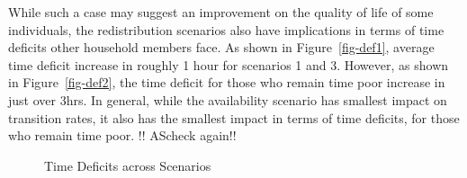 \documentclass[
  11pt,
]{article}
\begin{document}
While such a case may suggest an improvement on the quality of life of
some individuals, the redistribution scenarios also have implications in
terms of time deficits other household members face. As shown in
Figure~\ref{fig-def1}, average time deficit increase in roughly 1 hour
for scenarios 1 and 3. However, as shown in Figure~\ref{fig-def2}, the
time deficit for those who remain time poor increase in just over 3hrs.
In general, while the availability scenario has smallest impact on
transition rates, it also has the smallest impact in terms of time
deficits, for those who remain time poor. !! AScheck again!!

\begin{figure}[H]


\caption{\label{fig-deficit}Time Deficits across Scenarios}

\end{figure}%
\end{document}
